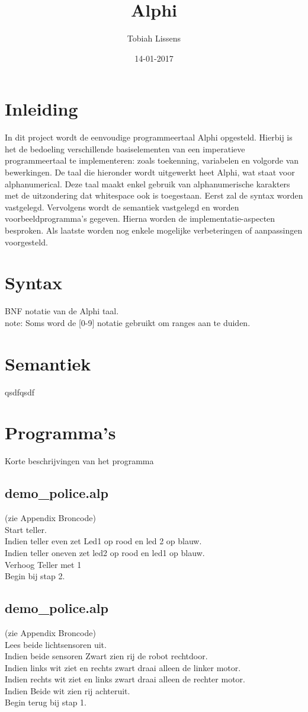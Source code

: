 \documentclass[a4paper,10pt]{article}
\title{Alphi}
\author{Tobiah Lissens}
\date{14-01-2017}
\begin{document}
\maketitle
\newpage
\tableofcontents
\newpage

\section{Inleiding}
In dit project wordt de eenvoudige programmeertaal Alphi opgesteld.
Hierbij is het de bedoeling verschillende basiselementen van een imperatieve programmeertaal te implementeren:
zoals toekenning, variabelen en volgorde van bewerkingen.
De taal die hieronder wordt uitgewerkt heet Alphi, wat staat voor alphanumerical.
Deze taal maakt enkel gebruik van alphanumerische karakters met de uitzondering dat whitespace ook is toegestaan.
Eerst zal de syntax worden vastgelegd.
Vervolgens wordt de semantiek vastgelegd en worden voorbeeldprogramma's gegeven.
Hierna worden de implementatie-aspecten besproken.
Als laatste worden nog enkele mogelijke verbeteringen of aanpassingen voorgesteld.

\newpage
\section{Syntax}
    BNF notatie van de Alphi taal.\\
    note: Soms word de [0-9] notatie gebruikt om ranges aan te duiden.
    

\section{Semantiek}
qsdfqsdf
\section{Programma's}
Korte beschrijvingen van het programma
  \subsection{demo\_police.alp}
 (zie Appendix Broncode)\\
   Start teller.\\
   Indien teller even zet Led1 op rood en led 2 op blauw.\\
   Indien teller oneven zet led2 op rood en led1 op blauw.\\
   Verhoog Teller met 1\\
   Begin bij stap 2.
\subsection{demo\_police.alp}
  (zie Appendix Broncode)\\
  Lees beide lichtsensoren uit.\\
  Indien beide sensoren Zwart zien rij de robot rechtdoor.\\
  Indien links wit ziet en rechts zwart draai alleen de linker motor.\\
  Indien rechts wit ziet en links zwart draai alleen de rechter motor.\\
  Indien Beide wit zien rij achteruit.\\
  Begin terug bij stap 1.
\end{document}
